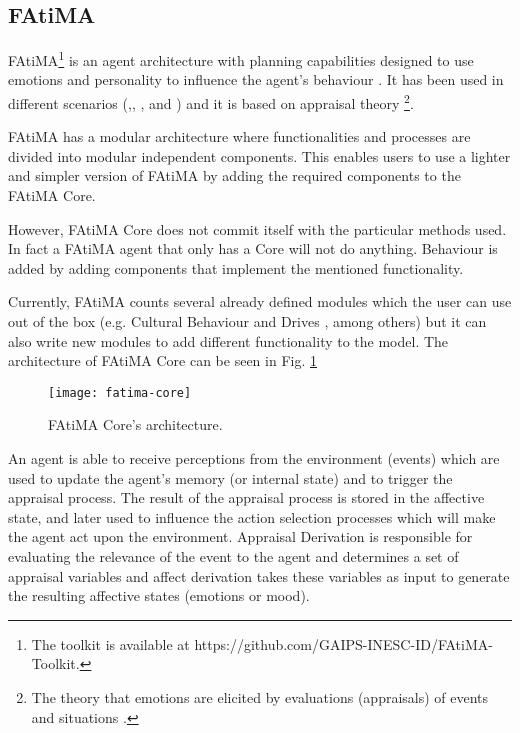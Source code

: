 \subsection{FAtiMA}
\ac{FAtiMA}\footnote{The toolkit is available at https://github.com/GAIPS-INESC-ID/FAtiMA-Toolkit.} is an agent architecture with planning capabilities designed to use emotions and personality to influence the agent's behaviour \cite{dias:fatima-modular}.
It has been used in different scenarios (\cite{paiva:learning-by-feeling},\cite{rodrigues:i-can-feel-to}, \cite{aylett:intercultural-empathy}, and \cite{correia:sueca}) and it is based on appraisal theory \footnote{The theory that emotions are elicited by evaluations (appraisals) of events and situations \cite{roseman:appraisal}.}.

\ac{FAtiMA} has a modular architecture where functionalities and processes are divided into modular independent components.
This enables users to use a lighter and simpler version of \ac{FAtiMA} by adding the required components to the \ac{FAtiMA} Core.

However, \ac{FAtiMA} Core does not commit itself with the particular methods used.
In fact a FAtiMA agent that only has a Core will not do anything.
Behaviour is added by adding components that implement the mentioned functionality.

Currently, \ac{FAtiMA} counts several already defined modules which the user can use out of the box (e.g. Cultural Behaviour \cite{mascarenhas:cultural-behaviour} and Drives \cite{lim:affective-npcs}, among others) but it can also write new modules to add different functionality to the model.
The architecture of \ac{FAtiMA} Core can be seen in Fig. \ref{fig:fatima-core}

\begin{figure}
  \centering
    \texttt{[image: fatima-core]}
  \caption{\ac{FAtiMA} Core's architecture.}
  \label{fig:fatima-core}
\end{figure}

An agent is able to receive perceptions from the environment (events) which are used to update the agent's memory (or internal state) and to trigger the appraisal process.
The result of the appraisal process is stored in the affective state, and later used to influence the action selection processes which will make the agent act upon the environment.
Appraisal Derivation is responsible for evaluating the relevance of the event to the agent and determines a set of appraisal variables and affect derivation takes these variables as input to generate the resulting affective states (emotions or mood).

